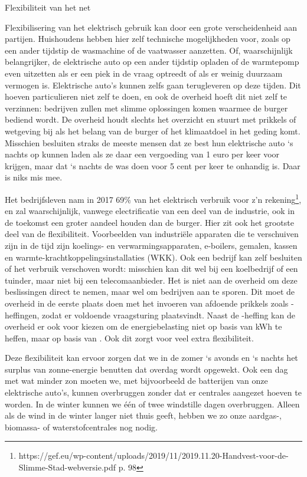 \begin{voorstel}{Flexibiliteit van het net}
\begin{overwegingen}
Flexibilisering van het elektrisch gebruik kan door een grote verscheidenheid aan partijen. Huishoudens hebben hier zelf technische mogelijkheden voor, zoals op een ander tijdstip de wasmachine of de vaatwasser aanzetten. Of, waarschijnlijk belangrijker, de elektrische auto op een ander tijdstip opladen of de warmtepomp even uitzetten als er een piek in de vraag optreedt of als er weinig duurzaam vermogen is. Elektrische auto’s kunnen zelfs gaan terugleveren op deze tijden. Dit hoeven particulieren niet zelf te doen, en ook de overheid hoeft dit niet zelf te verzinnen: bedrijven zullen met slimme oplossingen komen waarmee de burger bediend wordt. De overheid houdt slechts het overzicht en stuurt met prikkels of wetgeving bij als het belang van de burger of het klimaatdoel in het geding komt. Misschien besluiten straks de meeste mensen dat ze best hun elektrische auto ‘s nachts op kunnen laden als ze daar een vergoeding van 1 euro per keer voor krijgen, maar dat ‘s nachts de was doen voor 5 cent per keer te onhandig is. Daar is niks mis mee.

Het bedrijfsleven nam in 2017 69\% van het elektrisch verbruik voor z’n rekening\footnote{https://gef.eu/wp-content/uploads/2019/11/2019.11.20-Handvest-voor-de-Slimme-Stad-webversie.pdf p. 98}, en zal waarschijnlijk, vanwege electrificatie van een deel van de industrie, ook in de toekomst een groter aandeel houden dan de burger. Hier zit ook het grootste deel van de flexibiliteit. Voorbeelden van industriële apparaten die te verschuiven zijn in de tijd zijn koelings- en verwarmingsapparaten, e-boilers, gemalen, kassen en warmte-krachtkoppelingsinstallaties (WKK). Ook een bedrijf kan zelf besluiten of het verbruik verschoven wordt: misschien kan dit wel bij een koelbedrijf of een tuinder, maar niet bij een telecomaanbieder. Het is niet aan de overheid om deze beslissingen direct te nemen, maar wel om bedrijven aan te sporen. Dit moet de overheid in de eerste plaats doen met het invoeren van afdoende prikkels zoals \COO-heffingen, zodat er voldoende vraagsturing plaatsvindt. Naast de \COO-heffing kan de overheid er ook voor kiezen om de energiebelasting niet op basis van kWh te heffen, maar op basis van \COO. Ook dit zorgt voor veel extra flexibiliteit.

Deze flexibiliteit kan ervoor zorgen dat we in de zomer ‘s avonds en ‘s nachts het surplus van zonne-energie benutten dat overdag wordt opgewekt. Ook een dag met wat minder zon moeten we, met bijvoorbeeld de batterijen van onze elektrische auto’s, kunnen overbruggen zonder dat er centrales aangezet hoeven te worden. In de winter kunnen we één of twee windstille dagen overbruggen. Alleen als de wind in de winter langer niet thuis geeft, hebben we zo onze aardgas-, biomassa- of waterstofcentrales nog nodig.


\end{overwegingen}
\end{voorstel}
